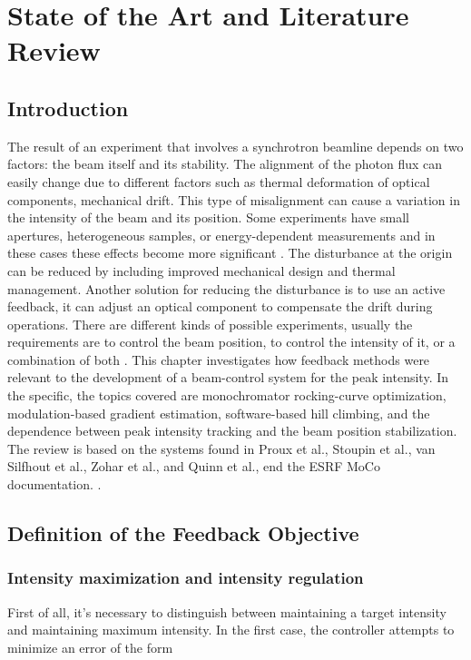 \chapter{State of the Art and Literature Review}\label{chap:State of the Art and Literature Review}

\section{Introduction}

The result of an experiment that involves a synchrotron beamline depends on two factors: the beam itself and its stability.
The alignment of the photon flux can easily change due to different factors such as thermal deformation of optical components, mechanical drift.
This type of misalignment can cause a variation in the intensity of the beam and its position.
Some experiments have small apertures, heterogeneous samples, or energy-dependent measurements and in these cases these effects become more significant
\cite{Proux2006,vanSilfhout2014,Quinn2021,Zohar2016}.
The disturbance at the origin can be reduced by including improved mechanical design and thermal management.
Another solution for reducing the disturbance is to use an active feedback, it can adjust an optical component to compensate the drift during operations.
There are different kinds of possible experiments, usually the requirements are to control the beam position, to control the intensity of it, or a combination of both
\cite{Proux2006,vanSilfhout2014,Quinn2021}.
This chapter investigates how feedback methods were relevant to the development of a beam-control system for the peak intensity.
In the specific, the topics covered are monochromator rocking-curve optimization, modulation-based gradient estimation, software-based hill climbing, and the dependence between peak intensity tracking and the beam position stabilization.
The review is based on the systems found in Proux et al., Stoupin et al., van Silfhout et al., Zohar et al., and Quinn et al., end the ESRF MoCo documentation.
\cite{Proux2006,Stoupin2010,vanSilfhout2014,Zohar2016,Quinn2021,MoCo2008}.

\section{Definition of the Feedback Objective}

\subsection{Intensity maximization and intensity regulation}
First of all, it's necessary to distinguish between maintaining a target intensity and maintaining maximum intensity.
In the first case, the controller attempts to minimize an error of the form

